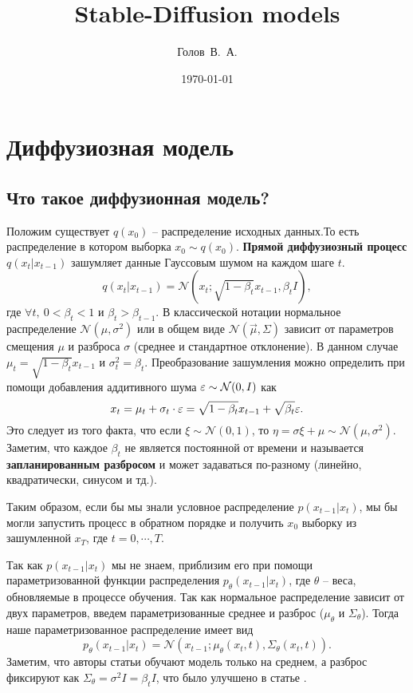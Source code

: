 \documentclass[11pt, a4paper, twocolumn, twoside]{article} %
\title{Stable-Diffusion models}
\author{Голов~В.~А.}
\affil{Конспекты по пройденному материалу}
\date{\today}
\begin{document}
\maketitle

\tableofcontents

\section{Диффузиозная модель}

\subsection{Что такое диффузионная модель?}

Положим существует $q(x_0)$ – распределение исходных данных.То есть распределение в котором выборка $x_0 \sim q(x_0)$. \textbf{Прямой диффузиозный процесс} $q(x_t | x_{t-1})$ зашумляет данные Гауссовым шумом на каждом шаге $t$. 
\begin{equation}
	q(x_t|x_{t-1}) = \mathcal{N}(x_t; \sqrt{1-\beta_t}x_{t-1}, \beta_t I),
\end{equation}
где $\forall t,~ 0 < \beta_t < 1$ и $\beta_t > \beta_{t-1}$. В классической нотации нормальное распределение $\mathcal{N}(\mu, \sigma^2)$ или в общем виде $\mathcal{N}(\vec{\mu}, \Sigma)$ зависит от параметров смещения $\mu$ и разброса $\sigma$ (среднее и стандартное отклонение). В данном случае $\mu_t = \sqrt{1-\beta_t}x_{t-1}$ и $\sigma_t^2 = \beta_t$. Преобразование зашумления можно определить при помощи добавления аддитивного шума $\varepsilon\sim\mathcal{N}(0, I)$ как 
\begin{equation}
	x_t = \mu_t + \sigma_t\cdot\varepsilon = \sqrt{1-\beta_t}x_{t-1} + \sqrt{\beta_t}\varepsilon.
\end{equation}
Это следует из того факта, что если $\xi\sim\mathcal{N}(0,1)$, то $\eta = \sigma\xi + \mu\sim\mathcal{N}(\mu, \sigma^2)$. Заметим, что каждое $\beta_t$ не является постоянной от времени и называется \textbf{запланированным разбросом} и может задаваться по-разному (линейно, квадратически, синусом и тд.).

Таким образом, если бы мы знали условное распределение $p(x_{t-1}| x_t)$, мы бы могли запустить процесс в обратном порядке и получить $x_0$ выборку из зашумленной $x_T$, где $t = 0,\cdots,T$. 

Так как $p(x_{t-1}| x_t)$ мы не знаем, приблизим его при помощи параметризованной функции распределения $p_{\theta}(x_{t-1} | x_t)$, где $\theta$ – веса, обновляемые в процессе обучения. Так как нормальное распределение зависит от двух параметров, введем параметризованные среднее и разброс ($\mu_{\theta}$ и $\Sigma_{\theta}$). Тогда наше параметризованное распределение имеет вид
\begin{equation}
	p_{\theta}(x_{t-1} | x_t) = \mathcal{N}(x_{t-1}; \mu_{\theta}(x_t,t), \Sigma_{\theta}(x_t, t)).
\end{equation}
Заметим, что авторы статьи \cite{Ho2020} обучают модель только на среднем, а разброс фиксируют как $\Sigma_{\theta} = \sigma^2 I = \beta_t I$, что было улучшено в статье \cite{Nichol2021a}.
\end{document}
